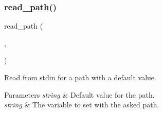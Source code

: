 \subsubsection{\texorpdfstring{read\+\_\+path()}{read\_path()}}
{\footnotesize\ttfamily read\+\_\+path (\begin{DoxyParamCaption}\item[{string}]{,  }\item[{string}]{ }\end{DoxyParamCaption})}



Read from stdin for a path with a default value. 


\begin{DoxyParams}{Parameters}
{\em string} & Default value for the path. \\
\hline
{\em string} & The variable to set with the asked path. \\
\hline
\end{DoxyParams}
